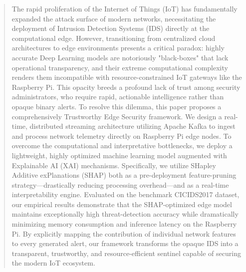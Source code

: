 \begin{abstract}
The rapid proliferation of the Internet of Things (IoT) has fundamentally expanded the attack surface of modern networks, necessitating the deployment of Intrusion Detection Systems (IDS) directly at the computational edge. However, transitioning from centralized cloud architectures to edge environments presents a critical paradox: highly accurate Deep Learning models are notoriously "black-boxes" that lack operational transparency, and their extreme computational complexity renders them incompatible with resource-constrained IoT gateways like the Raspberry Pi. This opacity breeds a profound lack of trust among security administrators, who require rapid, actionable intelligence rather than opaque binary alerts. To resolve this dilemma, this paper proposes a comprehensively Trustworthy Edge Security framework. We design a real-time, distributed streaming architecture utilizing Apache Kafka to ingest and process network telemetry directly on Raspberry Pi edge nodes. To overcome the computational and interpretative bottlenecks, we deploy a lightweight, highly optimized machine learning model augmented with Explainable AI (XAI) mechanisms. Specifically, we utilize SHapley Additive exPlanations (SHAP) both as a pre-deployment feature-pruning strategy—drastically reducing processing overhead—and as a real-time interpretability engine. Evaluated on the benchmark CICIDS2017 dataset, our empirical results demonstrate that the SHAP-optimized edge model maintains exceptionally high threat-detection accuracy while dramatically minimizing memory consumption and inference latency on the Raspberry Pi. By explicitly mapping the contribution of individual network features to every generated alert, our framework transforms the opaque IDS into a transparent, trustworthy, and resource-efficient sentinel capable of securing the modern IoT ecosystem.
\end{abstract}
